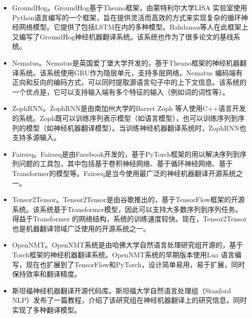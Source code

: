 \begin{appendices}
\begin{itemize}
\vspace{0.5em}
\item GroundHog。GroundHog基于Theano框架，由蒙特利尔大学LISA 实验室使用Python语言编写的一个框架，旨在提供灵活而高效的方式来实现复杂的循环神经网络模型。它提供了包括LSTM在内的多种模型。Bahdanau等人在此框架上又编写了GroundHog神经机器翻译系统。该系统也作为了很多论文的基线系统。
\vspace{0.5em}
\item Nematus。Nematus是英国爱丁堡大学开发的，基于Theano框架的神经机器翻译系统。该系统使用GRU作为隐层单元，支持多层网络。Nematus 编码端有正向和反向的编码方式，可以同时提取源语言句子中的上下文信息。该系统的一个优点是，它可以支持输入端有多个特征的输入（例如词的词性等）。
\vspace{0.5em}
\item ZophRNN。ZophRNN是由南加州大学的Barret Zoph 等人使用C++语言开发的系统。Zoph既可以训练序列表示模型（如语言模型），也可以训练序列到序列的模型（如神经机器翻译模型）。当训练神经机器翻译系统时，ZophRNN也支持多源输入。
\vspace{0.5em}
\item Fairseq。Fairseq是由Facebook开发的，基于PyTorch框架的用以解决序列到序列问题的工具包，其中包括基于卷积神经网络、基于循环神经网络、基于Transformer的模型等。Fairseq是当今使用最广泛的神经机器翻译开源系统之一。
\vspace{0.5em}
\item Tensor2Tensor。Tensor2Tensor是由谷歌推出的，基于TensorFlow框架的开源系统。该系统基于Transformer模型，因此可以支持大多数序列到序列任务。得益于Transformer 的网络结构，系统的训练速度较快。现在，Tensor2Tensor也是机器翻译领域广泛使用的开源系统之一。
\vspace{0.5em}
\item OpenNMT。OpenNMT系统是由哈佛大学自然语言处理研究组开源的，基于Torch框架的神经机器翻译系统。OpenNMT系统的早期版本使用Lua 语言编写，现在也扩展到了TensorFlow和PyTorch，设计简单易用，易于扩展，同时保持效率和翻译精度。
\vspace{0.5em}
\item 斯坦福神经机器翻译开源代码库。斯坦福大学自然语言处理组（Stanford NLP）发布了一篇教程，介绍了该研究组在神经机器翻译上的研究信息，同时实现了多种翻译模型。 
\vspace{0.5em}

\end{itemize}
\end{appendices}
